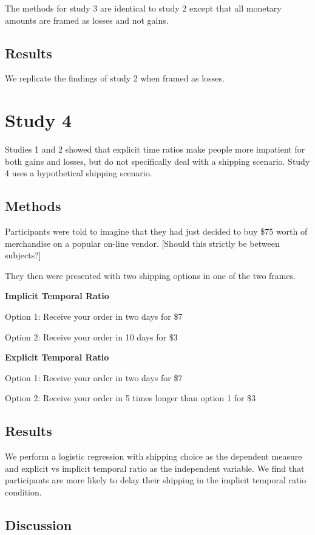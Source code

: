 \documentclass[]{article}
\begin{document}
The methods for study 3 are identical to study 2 except that all monetary amounts are framed as losses and not gains. 

\subsection{Results}

We replicate the findings of study 2 when framed as losses. 

\section{Study 4}

Studies 1 and 2 showed that explicit time ratios make people more impatient for both gains and losses, but do not specifically deal with a shipping scenario. Study 4 uses a hypothetical shipping scenario.

\subsection{Methods}

Participants were told to imagine that they had just decided to buy \$75 worth of merchandise on a popular on-line vendor. 
[Should this strictly be between subjects?]

They then were presented with two shipping options in one of the two frames.

\textbf{Implicit Temporal Ratio}

Option 1: Receive your order in two days for \$7

Option 2: Receive your order in 10 days for \$3
 
 
\textbf{Explicit Temporal Ratio}

Option 1: Receive your order in two days for \$7

Option 2: Receive your order in 5 times longer than option 1 for \$3

\subsection{Results}

We perform a logistic regression with shipping choice as the dependent measure and explicit vs implicit temporal ratio as the independent variable. 
We find that participants are more likely to delay their shipping in the implicit temporal ratio condition. 

\subsection{Discussion}
\end{document}
